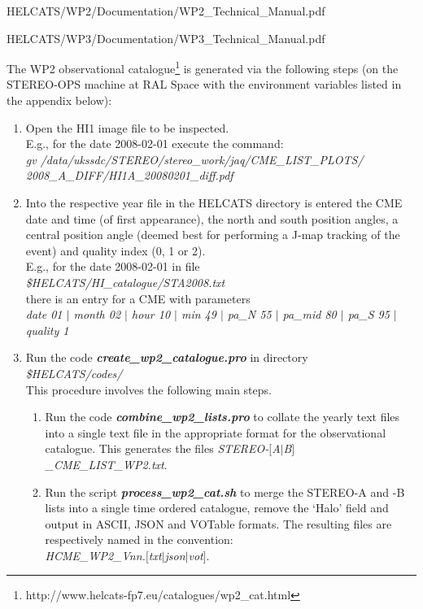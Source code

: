 \documentclass[12pt, a4paper, oneside]{article}
\begin{document}
HELCATS/WP2/Documentation/WP2\_Technical\_Manual.pdf

HELCATS/WP3/Documentation/WP3\_Technical\_Manual.pdf


The WP2 observational catalogue\footnote{http://www.helcats-fp7.eu/catalogues/wp2\_cat.html} is generated via the following steps (on the STEREO-OPS machine at RAL Space with the environment variables listed in the appendix below):

\begin{enumerate}

\item Open the HI1 image file to be inspected. \\
E.g., for the date 2008-02-01 execute the command:\\
\textit{gv /data/ukssdc/STEREO/stereo\_work/jaq/CME\_LIST\_PLOTS/\\2008\_A\_DIFF/HI1A\_20080201\_diff.pdf}

\item Into the respective year file in the HELCATS directory is entered the CME date and time (of first appearance), the north and south position angles, a central position angle (deemed best for performing a J-map tracking of the event) and quality index (0, 1 or 2).\\
E.g., for the date 2008-02-01 in file \\
\textit{\$HELCATS/HI\_catalogue/STA2008.txt}\\
there is an entry for a CME with parameters\\
\textit{date 01 $|$ month 02 $|$ hour 10 $|$ min 49 $|$ pa\_N 55 $|$ pa\_mid 80 $|$ pa\_S 95 $|$ quality 1}

\item Run the code {\bf \textit{create\_wp2\_catalogue.pro}} in directory\\
	\textit{\$HELCATS/codes/} \\
	This procedure involves the following main steps.

	\begin{enumerate}
	\item Run the code {\bf \textit{combine\_wp2\_lists.pro}} to collate the yearly text files into a single text file in the appropriate format for the observational catalogue. This generates the files \textit{STEREO-$[$A$|$B$]$\_CME\_LIST\_WP2.txt}.

	\item Run the script {\bf \textit{process\_wp2\_cat.sh}} to merge the STEREO-A and -B lists into a single time ordered catalogue, remove the `Halo' field and output in ASCII, JSON and VOTable formats. The resulting files are respectively named in the convention:\\ \textit{HCME\_WP2\_Vnn.$[$txt$|$json$|$vot$]$}.

	\end{enumerate}
	
\end{enumerate}
\end{document}
